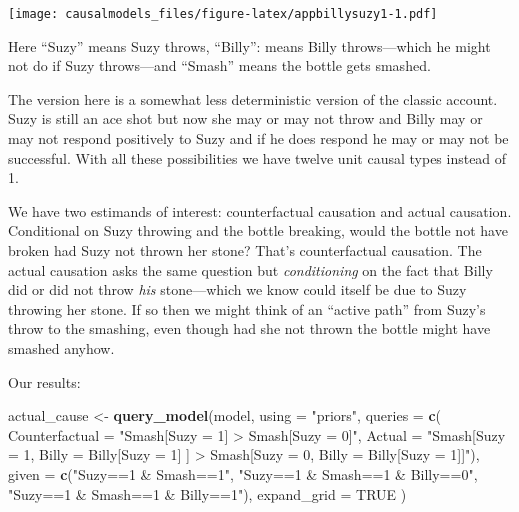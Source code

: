 \documentclass[
  12pt,
]{book}
\newenvironment{Shaded}{\begin{snugshade}}{\end{snugshade}}
\newcommand{\AttributeTok}[1]{\textcolor[rgb]{0.13,0.29,0.53}{#1}}
\newcommand{\ConstantTok}[1]{\textcolor[rgb]{0.56,0.35,0.01}{#1}}
\newcommand{\FunctionTok}[1]{\textcolor[rgb]{0.13,0.29,0.53}{\textbf{#1}}}
\newcommand{\NormalTok}[1]{#1}
\newcommand{\OtherTok}[1]{\textcolor[rgb]{0.56,0.35,0.01}{#1}}
\newcommand{\StringTok}[1]{\textcolor[rgb]{0.31,0.60,0.02}{#1}}
\begin{document}
\texttt{[image: causalmodels\_files/figure-latex/appbillysuzy1-1.pdf]}

Here ``Suzy'' means Suzy throws, ``Billy'': means Billy throws---which he might not do if Suzy throws---and ``Smash'' means the bottle gets smashed.

The version here is a somewhat less deterministic version of the classic account. Suzy is still an ace shot but now she may or may not throw and Billy may or may not respond positively to Suzy and if he does respond he may or may not be successful. With all these possibilities we have twelve unit causal types instead of 1.

We have two estimands of interest: counterfactual causation and actual causation. Conditional on Suzy throwing and the bottle breaking, would the bottle not have broken had Suzy not thrown her stone? That's counterfactual causation. The actual causation asks the same question but \emph{conditioning} on the fact that Billy did or did not throw \emph{his} stone---which we know could itself be due to Suzy throwing her stone. If so then we might think of an ``active path'' from Suzy's throw to the smashing, even though had she not thrown the bottle might have smashed anyhow.

Our results:

\begin{Shaded}
\begin{Highlighting}[]
\NormalTok{actual\_cause }\OtherTok{\textless{}{-}} \FunctionTok{query\_model}\NormalTok{(model, }\AttributeTok{using =} \StringTok{"priors"}\NormalTok{,}
  \AttributeTok{queries =} \FunctionTok{c}\NormalTok{(}
    \AttributeTok{Counterfactual =} \StringTok{"Smash[Suzy = 1] \textgreater{} Smash[Suzy = 0]"}\NormalTok{,}
    \AttributeTok{Actual =} \StringTok{"Smash[Suzy = 1, Billy = Billy[Suzy = 1] ] \textgreater{} }
\StringTok{              Smash[Suzy = 0, Billy = Billy[Suzy = 1]]"}\NormalTok{),}
  \AttributeTok{given =} \FunctionTok{c}\NormalTok{(}\StringTok{"Suzy==1 \& Smash==1"}\NormalTok{, }\StringTok{"Suzy==1 \& Smash==1 \& Billy==0"}\NormalTok{, }\StringTok{"Suzy==1 \& Smash==1 \& Billy==1"}\NormalTok{),}
  \AttributeTok{expand\_grid =} \ConstantTok{TRUE}
\NormalTok{  )}
\end{Highlighting}
\end{Shaded}
\end{document}
